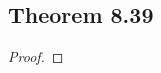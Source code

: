 \documentclass[../../main.tex]{subfiles}
\begin{document}
\subsection{Theorem 8.39}
\begin{wts}

\end{wts}
\begin{proof}

\end{proof}
\end{document}
